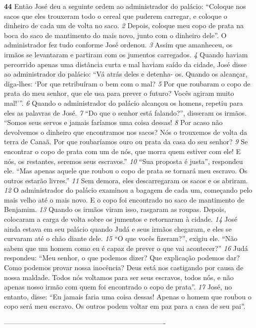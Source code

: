 \bigskip   
\textbf{\large 44}
 Então José deu a seguinte ordem ao administrador do palácio: “Coloque
nos sacos que eles trouxeram todo o cereal que puderem carregar, e coloque o
dinheiro de cada um de volta no saco. 
\textit{\tiny 2} 
Depois, coloque meu copo de prata na
boca do saco de mantimento do mais novo, junto com o dinheiro dele”. O
administrador fez tudo conforme José ordenou. 
\textit{\tiny 3}
Assim que amanheceu, os irmãos se levantaram e partiram com os jumentos
carregados. 
\textit{\tiny 4} 
Quando haviam percorrido apenas uma distância curta e mal haviam
saído da cidade, José disse ao administrador do palácio: “Vá atrás deles e detenha-
os. Quando os alcançar, diga-lhes: ‘Por que retribuíram o bem com o mal? 
\textit{\tiny 5} 
Por
que roubaram o copo de prata
 do meu senhor, que ele usa para prever o futuro?
Vocês agiram muito mal!’”. 
\textit{\tiny 6}
Quando o administrador do palácio alcançou os homens, repetiu para eles as
palavras de José. 
\textit{\tiny 7}
“Do   que o senhor está falando?”, disseram os irmãos. “Somos seus servos e
jamais faríamos uma coisa dessas! 
\textit{\tiny 8}
Por acaso não devolvemos o dinheiro que
encontramos nos sacos? Nós o trouxemos de volta da terra de Canaã. Por que
roubaríamos ouro ou prata da casa do seu senhor? 
\textit{\tiny 9} 
Se encontrar o copo de prata
com um de nós, que morra quem estiver com ele! E nós, os restantes, seremos seus
escravos.”
\textit{\tiny 10}
“Sua proposta é justa”, respondeu ele. “Mas apenas aquele que roubou o copo
de prata se tornará meu escravo. Os outros estarão livres.”
\textit{\tiny 11}
Sem demora, eles descarregaram os sacos e os abriram. 
\textit{\tiny 12}
O administrador
do palácio examinou a bagagem de cada um, começando pelo mais velho até o
mais novo. E o copo foi encontrado no saco de mantimento de Benjamim.
\textit{\tiny 13}
Quando os irmãos viram isso, rasgaram as roupas. Depois, colocaram a carga de
volta sobre os jumentos e retornaram à cidade.
\textit{\tiny 14}
José ainda estava em seu palácio quando Judá e seus irmãos chegaram, e eles
se curvaram até o chão diante dele. 
\textit{\tiny 15}
“O que vocês fizeram?”, exigiu ele. “Não
sabem que um homem como eu é capaz de prever o que vai acontecer?”
\textit{\tiny 16}
Judá respondeu: “Meu senhor, o que podemos dizer? Que explicação
podemos dar? Como podemos provar nossa inocência? Deus está nos castigando
por causa de nossa maldade. Todos nós voltamos para ser seus escravos, todos
nós, e não apenas nosso irmão com quem foi encontrado o copo de prata”.
\textit{\tiny 17}
José, no entanto, disse: “Eu jamais faria uma coisa dessas! Apenas o homem
que roubou o copo será meu escravo. Os outros podem voltar em paz para a casa
de seu pai”.



----------------------------------------------------------------------
